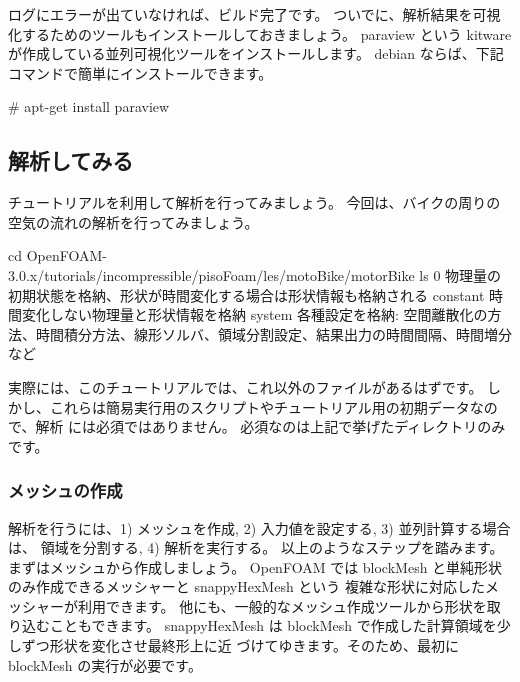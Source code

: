\documentclass[mingoth,a4paper]{jsarticle}
\begin{document}
ログにエラーが出ていなければ、ビルド完了です。
ついでに、解析結果を可視化するためのツールもインストールしておきましょう。
paraview という kitware が作成している並列可視化ツールをインストールします。
debian ならば、下記コマンドで簡単にインストールできます。

\begin{commandline}
# apt-get install paraview
\end{commandline}

\subsection{解析してみる}
チュートリアルを利用して解析を行ってみましょう。
今回は、バイクの周りの空気の流れの解析を行ってみましょう。

\begin{commandline}
cd OpenFOAM-3.0.x/tutorials/incompressible/pisoFoam/les/motoBike/motorBike
ls
0        物理量の初期状態を格納、形状が時間変化する場合は形状情報も格納される
constant 時間変化しない物理量と形状情報を格納
system   各種設定を格納: 空間離散化の方法、時間積分方法、線形ソルバ、領域分割設定、結果出力の時間間隔、時間増分など
\end{commandline}

実際には、このチュートリアルでは、これ以外のファイルがあるはずです。
しかし、これらは簡易実行用のスクリプトやチュートリアル用の初期データなので、解析
には必須ではありません。
必須なのは上記で挙げたディレクトリのみです。

\subsubsection{メッシュの作成}
解析を行うには、1) メッシュを作成, 2) 入力値を設定する, 3) 並列計算する場合は、
領域を分割する, 4) 解析を実行する。
以上のようなステップを踏みます。まずはメッシュから作成しましょう。
OpenFOAM では blockMesh と単純形状のみ作成できるメッシャーと snappyHexMesh という
複雑な形状に対応したメッシャーが利用できます。
他にも、一般的なメッシュ作成ツールから形状を取り込むこともできます。
snappyHexMesh は blockMesh で作成した計算領域を少しずつ形状を変化させ最終形上に近
づけてゆきます。そのため、最初に blockMesh の実行が必要です。
\end{document}
